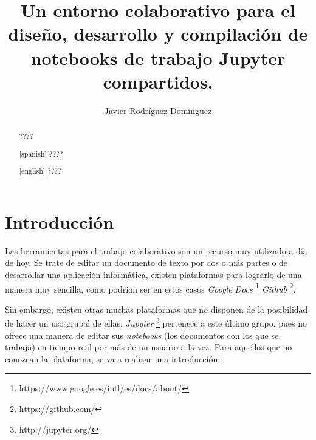 \documentclass[11pt,spanish,listoffigures,listoftables]{tfgetsinf}
\title{Un entorno colaborativo para el diseño, desarrollo y compilación de notebooks de trabajo Jupyter compartidos. }
\author{Javier Rodríguez Domínguez}
\begin{document}

\begin{abstract}
????
\end{abstract}
\begin{abstract}[spanish]
????
\end{abstract}
\begin{abstract}[english]
????
\end{abstract}


\mainmatter





\chapter{Introducci\'on}
\label{ch:intro}

Las herramientas para el trabajo colaborativo son un recurso muy utilizado a día de hoy. Se trate de editar un documento de texto por dos o más partes o de desarrollar una aplicación informática, existen plataformas para lograrlo de una manera muy sencilla, como podrían ser en estos casos \textit{Google Docs} \footnote{https://www.google.es/intl/es/docs/about/} \textit{Github} \footnote{https://github.com/}. 

Sin embargo, existen otras muchas plataformas que no disponen de la posibilidad de hacer un uso grupal de ellas. \textit{Jupyter} \footnote{http://jupyter.org/} pertenece a este último grupo, pues no ofrece una manera de editar sus \textit{notebooks} (los documentos con los que se trabaja) en tiempo real por más de un usuario a la vez. Para aquellos que no conozcan la plataforma, se va a realizar una introducción:
\end{document}
